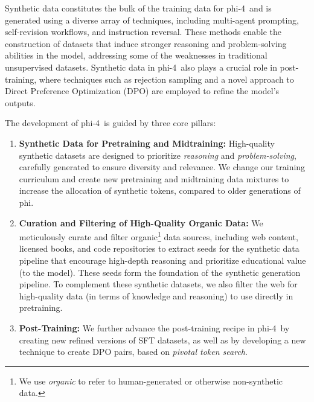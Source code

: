 \documentclass[11pt]{article}
\newcommand{\modelwithoutspace}{\textsf{phi-4}}
\newcommand{\model}{\modelwithoutspace~}
\begin{document}
Synthetic data constitutes the bulk of the training data for \model and is generated using a diverse array of techniques, including multi-agent prompting, self-revision workflows, and instruction reversal. These methods enable the construction of  datasets that induce stronger reasoning and problem-solving abilities in the model, addressing some of the weaknesses in traditional unsupervised datasets. Synthetic data in \model also plays a crucial role in post-training, where techniques such as rejection sampling and a novel approach to Direct Preference Optimization (DPO) are employed to refine the model’s outputs.

The development of \model is guided by three core pillars: \begin{enumerate} 
\item 
\textbf{Synthetic Data for Pretraining and Midtraining:} High-quality synthetic datasets are designed to prioritize \emph{reasoning} and \emph{problem-solving}, carefully generated to ensure diversity and relevance. We change our training curriculum and create new pretraining and midtraining data mixtures to increase the allocation of synthetic tokens, compared to older generations of \textsf{phi}.


\item 
\textbf{Curation and Filtering of High-Quality Organic Data:} We meticulously curate and filter organic\footnote{We use \textit{organic} to refer to human-generated or otherwise non-synthetic data.} data sources, including web content, licensed books, and code repositories to extract seeds for the synthetic data pipeline that encourage high-depth reasoning and prioritize educational value (to the model). These seeds form the foundation of the synthetic generation pipeline. 
To complement these synthetic datasets, we also filter the web for high-quality data (in terms of knowledge and reasoning) to use directly in pretraining.

\item \textbf{Post-Training:} We further advance the post-training recipe in \model by creating new refined versions of SFT datasets, as well as by developing a new technique to create DPO pairs, based on \emph{pivotal token search}.

\end{enumerate}
\end{document}
